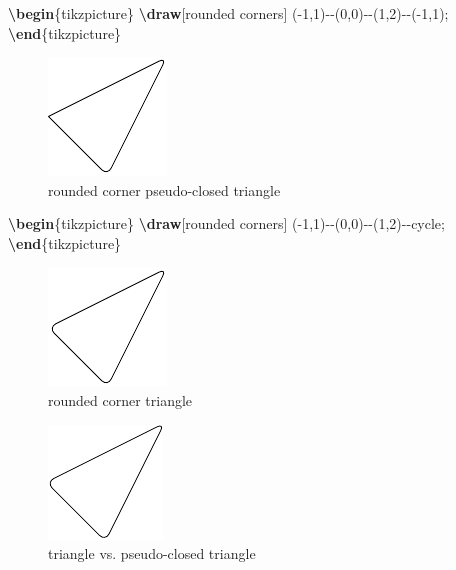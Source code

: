 \documentclass[
]{book}
\newenvironment{Shaded}{\begin{snugshade}}{\end{snugshade}}
\newcommand{\ExtensionTok}[1]{#1}
\newcommand{\FunctionTok}[1]{\textcolor[rgb]{0.13,0.29,0.53}{\textbf{#1}}}
\newcommand{\KeywordTok}[1]{\textcolor[rgb]{0.13,0.29,0.53}{\textbf{#1}}}
\newcommand{\NormalTok}[1]{#1}
\theoremstyle{definition}
\theoremstyle{definition}
\theoremstyle{definition}
\theoremstyle{definition}
\theoremstyle{remark}
\begin{document}
\begin{Shaded}
\begin{Highlighting}[]
\KeywordTok{\textbackslash{}begin}\NormalTok{\{}\ExtensionTok{tikzpicture}\NormalTok{\}}
  \FunctionTok{\textbackslash{}draw}\NormalTok{[rounded corners] ({-}1,1){-}{-}(0,0){-}{-}(1,2){-}{-}({-}1,1);}
\KeywordTok{\textbackslash{}end}\NormalTok{\{}\ExtensionTok{tikzpicture}\NormalTok{\}}
\end{Highlighting}
\end{Shaded}

\begin{figure}
\includegraphics[width=0.25\linewidth]{202401311000-TikZ_files/figure-latex/unnamed-chunk-13-1} \caption{rounded corner pseudo-closed triangle}\label{fig:unnamed-chunk-13}
\end{figure}

\begin{Shaded}
\begin{Highlighting}[]
\KeywordTok{\textbackslash{}begin}\NormalTok{\{}\ExtensionTok{tikzpicture}\NormalTok{\}}
  \FunctionTok{\textbackslash{}draw}\NormalTok{[rounded corners] ({-}1,1){-}{-}(0,0){-}{-}(1,2){-}{-}cycle;}
\KeywordTok{\textbackslash{}end}\NormalTok{\{}\ExtensionTok{tikzpicture}\NormalTok{\}}
\end{Highlighting}
\end{Shaded}

\begin{figure}
\includegraphics[width=0.25\linewidth]{202401311000-TikZ_files/figure-latex/unnamed-chunk-15-1} \caption{rounded corner triangle}\label{fig:unnamed-chunk-15}
\end{figure}

\begin{figure}
\includegraphics[width=0.25\linewidth]{202401311000-TikZ_files/figure-latex/unnamed-chunk-16-1} \caption{triangle vs. pseudo-closed triangle}\label{fig:unnamed-chunk-16}
\end{figure}
\end{document}
